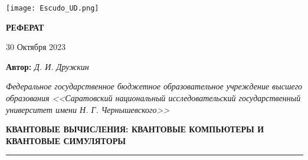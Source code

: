 \onecolumn\begin{@twocolumntrue}
    \begin{minipage}{0.3\textwidth}{\texttt{[image: Escudo\_UD.png]}}
    \end{minipage}
    \vspace{10pt}
    \begin{minipage}{0.677\textwidth}
        \begin{center}
            \vspace{12mm}
        
            \Large{\textbf{РЕФЕРАТ}}
            \vspace{4mm}

            30 Октября 2023 %
            \vspace{2mm}
            
            \large{\textbf{Автор:}\textit{ Д. И. Дружкин}} %
            \vspace{2mm}
    
            \large{\textit{Федеральное государственное бюджетное образовательное учреждение высшего образования <<Саратовский национальный исследовательский государственный университет имени Н. Г. Чернышевского>>}}
            \vspace{2mm}

            \textbf{КВАНТОВЫЕ ВЫЧИСЛЕНИЯ: КВАНТОВЫЕ КОМПЬЮТЕРЫ И КВАНТОВЫЕ СИМУЛЯТОРЫ}\\
\footnotesize   
        \end{center}
\end{minipage}
\noindent\textcolor{rojopro}{\rule{\textwidth}{3pt}}
\end{@twocolumntrue}